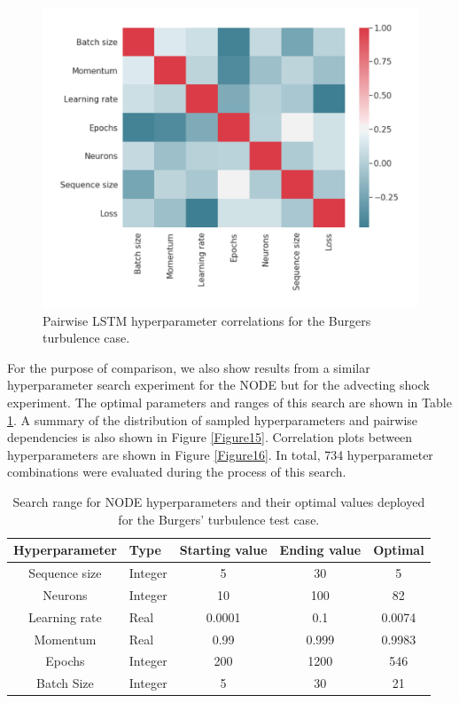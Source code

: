 \documentclass[preprint,12pt]{elsarticle}
\begin{document}
\begin{figure}
	\centering
	\includegraphics[width=\textwidth]{Figure_19.pdf}
	\caption{Pairwise LSTM hyperparameter correlations for the Burgers turbulence case.}
	\label{Figure14}
\end{figure}

For the purpose of comparison, we also show results from a similar hyperparameter search experiment for the NODE but for the advecting shock experiment. The optimal parameters and ranges of this search are shown in Table \ref{Table2}. A summary of the distribution of sampled hyperparameters and pairwise dependencies is also shown in Figure \ref{Figure15}. Correlation plots between hyperparameters are shown in Figure \ref{Figure16}. In total, 734 hyperparameter combinations were evaluated during the process of this search.

\begin{table}[]
\begin{tabular}{|c|l|c|c|c|}
\hline
Hyperparameter & Type    & Starting value & Ending value & Optimal \\ \hline
Sequence size  & Integer & 5              & 30           & 5       \\ \hline
Neurons        & Integer & 10             & 100          & 82      \\ \hline
Learning rate  & Real    & 0.0001         & 0.1          & 0.0074 \\ \hline
Momentum       & Real    & 0.99           & 0.999        & 0.9983  \\ \hline
Epochs         & Integer & 200            & 1200         & 546     \\ \hline
Batch Size     & Integer & 5              & 30           & 21      \\ \hline
\end{tabular}
\caption{Search range for NODE hyperparameters and their optimal values deployed for the Burgers' turbulence test case.}
\label{Table2}
\end{table}
\end{document}
